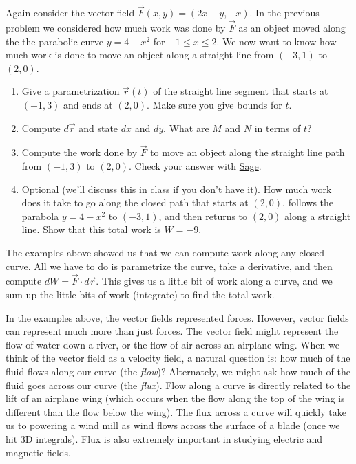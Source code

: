 \begin{problem}
 Again consider the vector field $\vec F(x,y) = (2x+y,-x)$. In the previous problem we considered how much work was done by $\vec F$ as an object moved along the the parabolic curve $y=4-x^2$ for $-1\leq x\leq 2$. We now want to know how much work is done to move an object along a straight line from $(-3,1)$ to $(2,0)$.    
\begin{enumerate}
 \item Give a parametrization $\vec r(t)$ of the straight line segment that starts at $(-1,3)$ and ends at $(2,0)$.  Make sure you give bounds for $t$. 
 \item Compute $d\vec r$ and state $dx$ and $dy$. What are $M$ and $N$ in terms of $t$?
 \item Compute the work done by $\vec F$ to move an object along the straight line path from $(-1,3)$ to $(2,0)$. Check your answer with \href{\sageworkurl}{Sage}. 
 \item Optional (we'll discuss this in class if you don't have it).  How much work does it take to go along the closed path that starts at $(2,0)$, follows the parabola $y=4-x^2$ to $(-3,1)$, and then returns to $(2,0)$ along a straight line. Show that this total work is $W=-9$.   
\end{enumerate}
\end{problem}


The examples above showed us that we can compute work along any closed curve.  All we have to do is parametrize the curve, take a derivative, and then compute $dW = \vec F \cdot d\vec r$. This gives us a little bit of work along a curve, and we sum up the little bits of work (integrate) to find the total work. 

In the examples above, the vector fields represented forces. However, vector fields can represent much more than just forces. The vector field might represent the flow of water down a river, or the flow of air across an airplane wing.  When we think of the vector field as a velocity field, a natural question is: how much of the fluid flows along our curve (the \emph{flow})? Alternately, we might ask how much of the fluid goes across our curve (the \emph{flux}).  Flow along a curve is directly related to the lift of an airplane wing (which occurs when the flow along the top of the wing is different than the flow below the wing).  The flux across a curve will quickly take us to powering a wind mill as wind flows across the surface of a blade (once we hit 3D integrals).  Flux is also extremely important in studying electric and magnetic fields.



